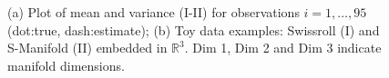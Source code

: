 \documentclass{article}
\newcommand{\Real}{\mathbb{R}}
\begin{document}
\begin{figure}[h!]
    \centering
    \caption{(a) Plot of mean and variance (I-II) for observations $i=1, \ldots, 95$ (dot:true, dash:estimate); (b) Toy data examples: Swissroll (I) and S-Manifold (II) embedded in $\Real^3$. Dim 1, Dim 2 and Dim 3 indicate manifold dimensions.}
    \label{fig1}
\end{figure}
%
\end{document}

